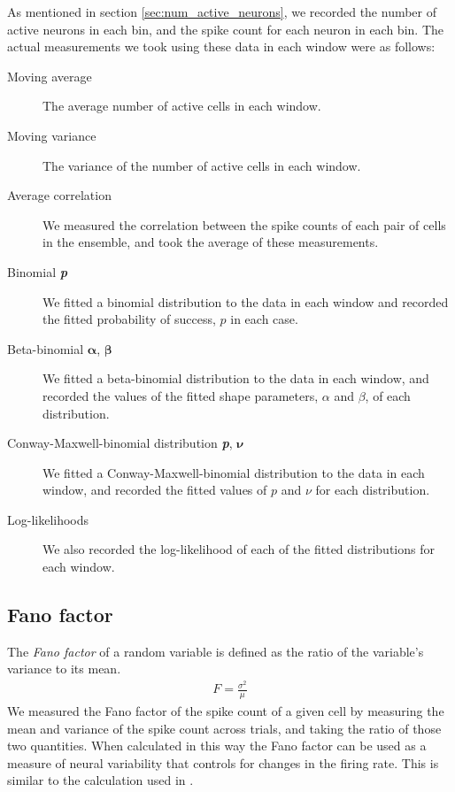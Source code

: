     As mentioned in section \ref{sec:num_active_neurons}, we recorded the number of active neurons in each bin, and the spike count for each neuron in each bin. The actual measurements we took using these data in each window were as follows:
    \begin{description}
      \item[Moving average] The average number of active cells in each window.
      \item[Moving variance] The variance of the number of active cells in each window.
      \item[Average correlation] We measured the correlation between the spike counts of each pair of cells in the ensemble, and took the average of these measurements.
      \item[Binomial \textit{\textbf{p}}] We fitted a binomial distribution to the data in each window and recorded the fitted probability of success, $p$ in each case.
      \item[Beta-binomial $\boldsymbol{\alpha}$, $\boldsymbol{\beta}$] We fitted a beta-binomial distribution to the data in each window, and recorded the values of the fitted shape parameters, $\alpha$ and $\beta$, of each distribution.
      \item[Conway-Maxwell-binomial distribution \textit{\textbf{p}}, $\boldsymbol{\nu}$] We fitted a Conway-Maxwell-binomial distribution to the data in each window, and recorded the fitted values of $p$ and $\nu$ for each distribution.
      \item[Log-likelihoods] We also recorded the log-likelihood of each of the fitted distributions for each window.
    \end{description}

    \subsection{Fano factor}\label{sec:fano_factor}
    The \textit{Fano factor} of a random variable is defined as the ratio of the variable's variance to its mean.
    \begin{align}\label{eq:fano_factor}
      F = \frac{\sigma^2}{\mu}
    \end{align}
    We measured the Fano factor of the spike count of a given cell by measuring the mean and variance of the spike count across trials, and taking the ratio of those two quantities. When calculated in this way the Fano factor can be used as a measure of neural variability that controls for changes in the firing rate.  This is similar to the calculation used in \parencite{churchland}.


